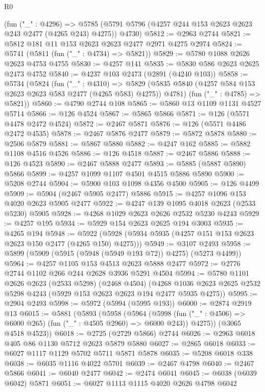 \begin{lexlean}{R0}
\begin{coremodule}
    (fun ("_" : @4296) =>
    @5785 (@5791 @5796 (@4257 @244 @153 @2623 @2623 @243 @2477 (@4265 @243) @4275)) @4730)
@5812 := @2963 @2744
@5821 := @5812 @181 @11 @153 @2623 @2623 @2477 @2971 @4275 @2974
@5824 := @5741 (@5811 (fun ("_" : @4734) => @5821))
@5829 := @5780 @1088 @2626 @2623 @4753 @4755
@5830 := @4257 @141
@5835 := @5830 @586 @2623 @2625 @2473 @4752
@5840 := @4237 @103 @2473 (@2891 (@4240 @103))
@5858 := @5734
    (@5824
      (fun ("_" : @4310) =>
      @5829 (@5835 @5840 (@4257 @584 @153 @2623 @2623 @583 @2477 (@4265 @583) @4275)) @4781)
      (fun ("_" : @4785) => @5821))
@5860 := @4790 @2744 @108
@5865 := @5860 @13 @1109 @1131 @4527 @5714
@5866 := @126 @4524
@5867 := @5865 @5866
@5871 := @126 (@5571 @4478 @2472 @4524)
@5872 := @2467 @5871
@5876 := @126 (@5571 @4486 @2472 @4535)
@5878 := @2467 @5876 @2477
@5879 := @5872 @5878
@5880 := @2506 @5879
@5881 := @5867 @5880
@5882 := @4247 @162
@5885 := @5882 @1108 @4516 @4526
@5886 := @126 @4518
@5887 := @2467 @5886
@5888 := @126 @4523
@5890 := @2467 @5888 @2477
@5893 := @5885 (@5887 @5890) @5866
@5899 := @4257 @1099 @1107 @4501 @4515 @5886 @5890
@5900 := @5208 @2744
@5904 := @5900 @103 @1098 @4356 @4500
@5905 := @126 @4499
@5909 := @5904 (@2467 @5905 @2477) @5886
@5915 := @4257 @1096 @153 @4020 @2623 @5905 @2477
@5922 := @4247 @139 @1095 @4018 @2623 (@2533 @5230) @5905
@5928 := @4268 @1029 @2623 @2626 @2532 @5230 @4243
@5929 := @4257 @195
@5934 := @5929 @154 @2623 @2625 @194 @3003
@5935 := @4265 @194
@5948 := @5922 (@5928 (@5934 @5935 (@4257 @151 @153 @2623 @2623 @150 @2477 (@4265 @150) @4275)))
@5949 := @3107 @2493
@5958 := @5899 (@5909 (@5915 (@5948 (@5949 @193 @72)) @4275) (@5273 @4499))
@5964 := @4257 @1105 @153 @4513 @2623 @5888 @2477
@5972 := @2776 @2744 @1102 @266 @244 @2628 @3936 @5291 @4504
@5994 := @5780
    @1101
    @2626
    @2623
    (@2533 @5298)
    (@2468 @4504)
    (@4268 @1036 @2623 @2625 @2532 @5298 @4243 (@5929 @153 @2623 @2623 @194 @2477 @5935 @4275))
@5995 := @2904 @2493
@5998 := @5972 (@5994 (@5995 @193))
@6000 := @2874 @2919 @13
@6015 := @5881
    (@5893
      (@5958
        (@5964
          (@5998 (fun ("_" : @4506) => @6000 @265) (fun ("_" : @4505 @2960) => @6000 @243))
          @4275))
      (@3065 @4518 @4523))
@6018 := @2725 (@2729 @5866) @2744
@6026 := @2963 @6018 @405 @86 @1130 @5712 @2623 @5879 @5880
@6027 := @2865 @6018
@6033 := @6027 @1117 @1129 @5702 @5711 @5871 @5878
@6035 := @5208 @6018 @338
@6038 := @6035 @1116 @4022 @5701
@6039 := @2467 @4798
@6040 := @2467 @5866
@6041 := @6040 @2477
@6042 := @2474 @6041
@6045 := @6038 (@6039 @6042) @5871
@6051 := @6027 @1113 @1115 @4020 @2626 @4798 @6042

\end{coremodule}
\end{lexlean}
